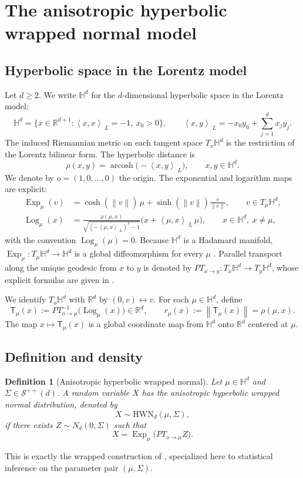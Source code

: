 \documentclass[11pt]{article}
\newtheorem{definition}{Definition}
\DeclareMathOperator{\arcosh}{arcosh}
\newcommand{\R}{\mathbb{R}}
\newcommand{\Hh}{\mathbb{H}}
\newcommand{\SPD}{\mathcal{S}^{++}}
\newcommand{\Exp}{\operatorname{Exp}}
\newcommand{\Log}{\operatorname{Log}}
\newcommand{\norm}[1]{\left\lVert #1\right\rVert}
\newcommand{\Loro}[2]{\left\langle #1,#2\right\rangle_{\;L}}
\newcommand{\T}{\mathsf{T}}
\begin{document}

\section{The anisotropic hyperbolic wrapped normal model}
\label{sec:model}

\subsection{Hyperbolic space in the Lorentz model}

Let $d\ge 2$. We write $\Hh^d$ for the $d$-dimensional hyperbolic space in the Lorentz model:
\[
\Hh^d=\{x\in\R^{d+1}:\Loro{x}{x}=-1,\ x_0>0\},
\qquad
\Loro{x}{y}=-x_0y_0+\sum_{j=1}^d x_jy_j .
\]
The induced Riemannian metric on each tangent space $T_x\Hh^d$ is the restriction of the Lorentz bilinear form. The hyperbolic distance is
\[
\rho(x,y)=\arcosh\bigl(-\Loro{x}{y}\bigr),
\qquad x,y\in\Hh^d.
\]
We denote by $o=(1,0,\dots,0)$ the origin. The exponential and logarithm maps are explicit:
\begin{align}
\Exp_\mu(v)
&=\cosh(\norm{v})\,\mu+\sinh(\norm{v})\frac{v}{\norm{v}},
\qquad v\in T_\mu\Hh^d, \label{eq:exp-lorentz}\\
\Log_\mu(x)
&=\frac{\rho(\mu,x)}{\sqrt{(-\Loro{\mu}{x})^2-1}}\bigl(x+\Loro{\mu}{x}\,\mu\bigr),
\qquad x\in\Hh^d,\ x\neq \mu , \label{eq:log-lorentz}
\end{align}
with the convention $\Log_\mu(\mu)=0$. Because $\Hh^d$ is a Hadamard manifold, $\Exp_\mu:T_\mu\Hh^d\to\Hh^d$ is a global diffeomorphism for every $\mu$ \citep{petersen_2006_RiemannianGeometry}. Parallel transport along the unique geodesic from $x$ to $y$ is denoted by $PT_{x\to y}:T_x\Hh^d\to T_y\Hh^d$, whose explicit formulas are given in \citet{nagano_2019_WrappedNormalDistribution}.

We identify $T_o\Hh^d$ with $\R^d$ by $(0,v)\leftrightarrow v$. For each $\mu\in\Hh^d$, define
\[
\T_\mu(x):=PT_{o\to\mu}^{-1}\bigl(\Log_\mu(x)\bigr)\in\R^d,
\qquad
r_\mu(x):=\norm{\T_\mu(x)}=\rho(\mu,x).
\]
The map $x\mapsto \T_\mu(x)$ is a global coordinate map from $\Hh^d$ onto $\R^d$ centered at $\mu$.

\subsection{Definition and density}

\begin{definition}[Anisotropic hyperbolic wrapped normal]
Let $\mu\in\Hh^d$ and $\Sigma\in\SPD(d)$. A random variable $X$ has the anisotropic hyperbolic wrapped normal distribution, denoted by
\[
X\sim \mathrm{HWN}_d(\mu,\Sigma),
\]
if there exists $Z\sim N_d(0,\Sigma)$ such that
\[
X=\Exp_\mu\bigl(PT_{o\to\mu}Z\bigr).
\]
\end{definition}
This is exactly the wrapped construction of \citet{nagano_2019_WrappedNormalDistribution}, specialized here to statistical inference on the parameter pair $(\mu,\Sigma)$.
\end{document}
